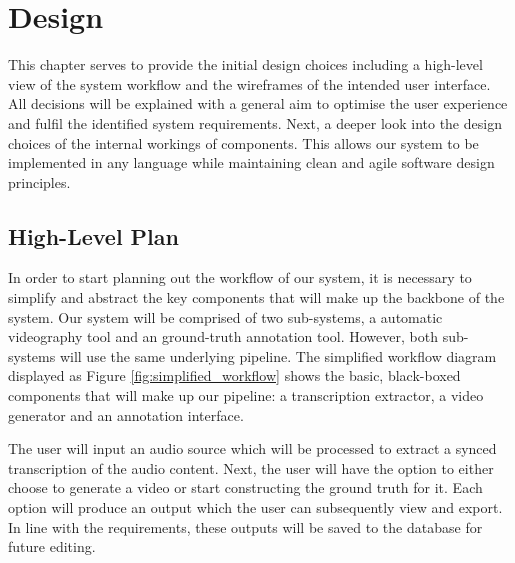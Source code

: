 \documentclass{l4proj}
\begin{document}


\chapter{Design}
This chapter serves to provide the initial design choices including a high-level view of the system workflow and the wireframes of the intended user interface. All decisions will be explained with a general aim to optimise the user experience and fulfil the identified system requirements. Next, a deeper look into the design choices of the internal workings of components. This allows our system to be implemented in any language while maintaining clean and agile software design principles. 

\section{High-Level Plan}
In order to start planning out the workflow of our system, it is necessary to simplify and abstract the key components that will make up the backbone of the system. Our system will be comprised of two sub-systems, a automatic videography tool and an ground-truth annotation tool. However, both sub-systems will use the same underlying pipeline. The simplified workflow diagram displayed as Figure \ref{fig:simplified_workflow} shows the basic, black-boxed components that will make up our pipeline: a transcription extractor, a video generator and an annotation interface.

The user will input an audio source which will be processed to extract a synced transcription of the audio content. Next, the user will have the option to either choose to generate a video or start constructing the ground truth for it. Each option will produce an output which the user can subsequently view and export. In line with the requirements, these outputs will be saved to the database for future editing.
\end{document}
